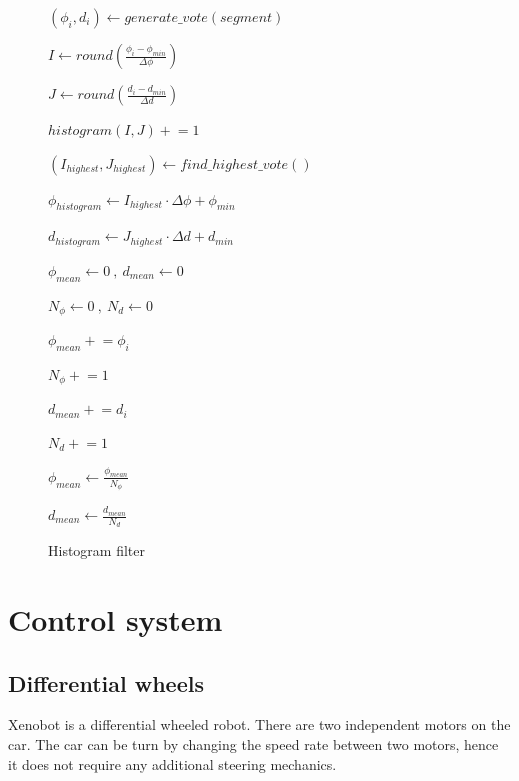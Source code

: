 \documentclass{article}
\begin{document}
\begin{figure} [ht]
\begin{algorithm}[H]
	 {
			$(\phi_i, d_i) \gets generate\_vote(segment)$
			
			$I \gets round(\frac{\phi_i - \phi_{min}}{\Delta\phi})$

			$J \gets round(\frac{d_i - d_{min}}{\Delta d})$
			
			$histogram(I, J) \mathrel{+}= 1$
	}
	
	$(I_{highest}, J_{highest}) \gets find \_ highest \_ vote()$	
	
	$\phi_{histogram} \gets I_{highest} \cdot \Delta \phi + \phi_{min}$
	
	$d_{histogram} \gets J_{highest} \cdot \Delta d + d_{min}$

	$\phi_{mean} \gets 0 \ , \  d_{mean} \gets 0$
	
	$N_{\phi} \gets 0 \ , \ N_{d} \gets 0$
	
	{
		{
			$\phi_{mean} \mathrel{+}= \phi_{i}$
			
			$N_{\phi} \mathrel{+}= 1$
		}
		
		{
			$d_{mean} \mathrel{+}= d_{i}$
			
			$N_{d} \mathrel{+}= 1$
		}
	}
	
	$\phi_{mean} \gets \frac{\phi_{mean}}{N_{\phi}}$
	
	$d_{mean} \gets \frac{d_{mean}}{N_{d}}$	
	\caption{Histogram filter}
\end{algorithm}
\end{figure}
\FloatBarrier

\clearpage

\section{Control system}

\subsection{Differential wheels}

Xenobot is a differential wheeled robot. There are two independent motors on the car. The car can be turn by changing the speed rate between two motors, hence it does not require any additional steering mechanics.
\end{document}
